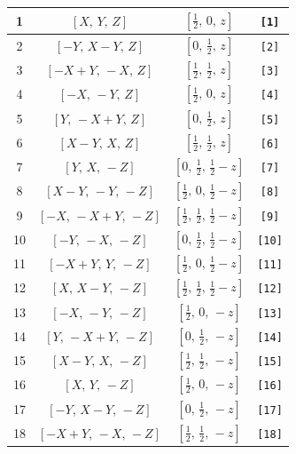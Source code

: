 \documentclass[fleqn,8pt]{jsarticle}
\begin{document}
\begin{longtable}{cccc}
1 & $\left[ X,\, Y,\, Z \right]$ & $\left[ \frac{1}{2},\, 0,\, z \right]$ & {\tt [1]} \\ \hline
2 & $\left[ - Y,\, X - Y,\, Z \right]$ & $\left[ 0,\, \frac{1}{2},\, z \right]$ & {\tt [2]} \\ \hline
3 & $\left[ - X + Y,\, - X,\, Z \right]$ & $\left[ \frac{1}{2},\, \frac{1}{2},\, z \right]$ & {\tt [3]} \\ \hline
4 & $\left[ - X,\, - Y,\, Z \right]$ & $\left[ \frac{1}{2},\, 0,\, z \right]$ & {\tt [4]} \\ \hline
5 & $\left[ Y,\, - X + Y,\, Z \right]$ & $\left[ 0,\, \frac{1}{2},\, z \right]$ & {\tt [5]} \\ \hline
6 & $\left[ X - Y,\, X,\, Z \right]$ & $\left[ \frac{1}{2},\, \frac{1}{2},\, z \right]$ & {\tt [6]} \\ \hline
7 & $\left[ Y,\, X,\, - Z \right]$ & $\left[ 0,\, \frac{1}{2},\, \frac{1}{2} - z \right]$ & {\tt [7]} \\ \hline
8 & $\left[ X - Y,\, - Y,\, - Z \right]$ & $\left[ \frac{1}{2},\, 0,\, \frac{1}{2} - z \right]$ & {\tt [8]} \\ \hline
9 & $\left[ - X,\, - X + Y,\, - Z \right]$ & $\left[ \frac{1}{2},\, \frac{1}{2},\, \frac{1}{2} - z \right]$ & {\tt [9]} \\ \hline
10 & $\left[ - Y,\, - X,\, - Z \right]$ & $\left[ 0,\, \frac{1}{2},\, \frac{1}{2} - z \right]$ & {\tt [10]} \\ \hline
11 & $\left[ - X + Y,\, Y,\, - Z \right]$ & $\left[ \frac{1}{2},\, 0,\, \frac{1}{2} - z \right]$ & {\tt [11]} \\ \hline
12 & $\left[ X,\, X - Y,\, - Z \right]$ & $\left[ \frac{1}{2},\, \frac{1}{2},\, \frac{1}{2} - z \right]$ & {\tt [12]} \\ \hline
13 & $\left[ - X,\, - Y,\, - Z \right]$ & $\left[ \frac{1}{2},\, 0,\, - z \right]$ & {\tt [13]} \\ \hline
14 & $\left[ Y,\, - X + Y,\, - Z \right]$ & $\left[ 0,\, \frac{1}{2},\, - z \right]$ & {\tt [14]} \\ \hline
15 & $\left[ X - Y,\, X,\, - Z \right]$ & $\left[ \frac{1}{2},\, \frac{1}{2},\, - z \right]$ & {\tt [15]} \\ \hline
16 & $\left[ X,\, Y,\, - Z \right]$ & $\left[ \frac{1}{2},\, 0,\, - z \right]$ & {\tt [16]} \\ \hline
17 & $\left[ - Y,\, X - Y,\, - Z \right]$ & $\left[ 0,\, \frac{1}{2},\, - z \right]$ & {\tt [17]} \\ \hline
18 & $\left[ - X + Y,\, - X,\, - Z \right]$ & $\left[ \frac{1}{2},\, \frac{1}{2},\, - z \right]$ & {\tt [18]} \\ \hline

\end{longtable}
\end{document}
